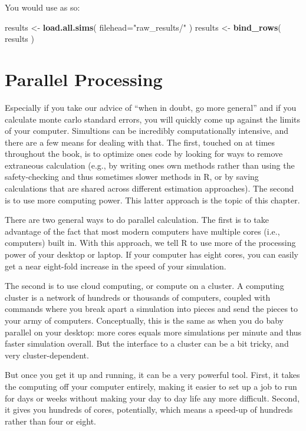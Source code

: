 \documentclass[
]{book}
\newenvironment{Shaded}{\begin{snugshade}}{\end{snugshade}}
\newcommand{\AttributeTok}[1]{\textcolor[rgb]{0.13,0.29,0.53}{#1}}
\newcommand{\FunctionTok}[1]{\textcolor[rgb]{0.13,0.29,0.53}{\textbf{#1}}}
\newcommand{\NormalTok}[1]{#1}
\newcommand{\OtherTok}[1]{\textcolor[rgb]{0.56,0.35,0.01}{#1}}
\newcommand{\StringTok}[1]{\textcolor[rgb]{0.31,0.60,0.02}{#1}}
\begin{document}
You would use as so:

\begin{Shaded}
\begin{Highlighting}[]
\NormalTok{results }\OtherTok{\textless{}{-}} \FunctionTok{load.all.sims}\NormalTok{( }\AttributeTok{filehead=}\StringTok{"raw\_results/"}\NormalTok{ )}
\NormalTok{results }\OtherTok{\textless{}{-}} \FunctionTok{bind\_rows}\NormalTok{( results )}
\end{Highlighting}
\end{Shaded}

\chapter{Parallel Processing}\label{parallel-processing}

Especially if you take our advice of ``when in doubt, go more general'' and if you calculate monte carlo standard errors, you will quickly come up against the limits of your computer.
Simultions can be incredibly computationally intensive, and there are a few means for dealing with that.
The first, touched on at times throughout the book, is to optimize ones code by looking for ways to remove extraneous calculation (e.g., by writing ones own methods rather than using the safety-checking and thus sometimes slower methods in R, or by saving calculations that are shared across different estimation approaches).
The second is to use more computing power.
This latter approach is the topic of this chapter.

There are two general ways to do parallel calculation.
The first is to take advantage of the fact that most modern computers have multiple cores (i.e., computers) built in.
With this approach, we tell R to use more of the processing power of your desktop or laptop.
If your computer has eight cores, you can easily get a near eight-fold increase in the speed of your simulation.

The second is to use cloud computing, or compute on a cluster.
A computing cluster is a network of hundreds or thousands of computers, coupled with commands where you break apart a simulation into pieces and send the pieces to your army of computers.
Conceptually, this is the same as when you do baby parallel on your desktop: more cores equals more simulations per minute and thus faster simulation overall.
But the interface to a cluster can be a bit tricky, and very cluster-dependent.

But once you get it up and running, it can be a very powerful tool.
First, it takes the computing off your computer entirely, making it easier to set up a job to run for days or weeks without making your day to day life any more difficult.
Second, it gives you hundreds of cores, potentially, which means a speed-up of hundreds rather than four or eight.
\end{document}
